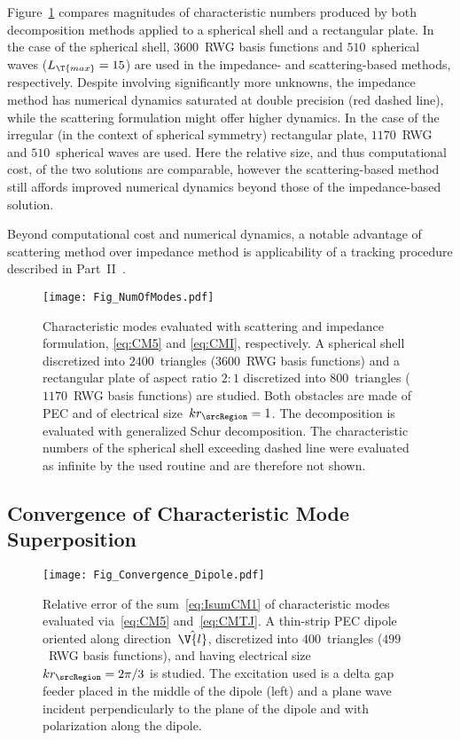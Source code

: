 \documentclass[journal]{IEEEtran}
\providecommand{\aCircum}{r_\srcRegion} %
\begin{document}
Figure~\ref{fig:dynamics} compares magnitudes of characteristic numbers produced by both decomposition methods applied to a spherical shell and a rectangular plate.  In the case of the spherical shell, $3600$~RWG basis functions and $510$~spherical waves ($L_\T{max} = 15$) are used in the impedance- and scattering-based methods, respectively. Despite involving significantly more unknowns, the impedance method has numerical dynamics saturated at double precision (red dashed line), while the scattering formulation might offer higher dynamics. In the case of the irregular (in the context of spherical symmetry) rectangular plate, $1170$~RWG and $510$~spherical waves are used. Here the relative size, and thus computational cost, of the two solutions are comparable, however the scattering-based method still affords improved numerical dynamics beyond those of the impedance-based solution.

Beyond computational cost and numerical dynamics, a notable advantage of scattering method over impedance method is applicability of a tracking procedure described in Part~II~\cite{Gustafsson+etal_CMT2_2021}.

\begin{figure}[]
    \centering
    \texttt{[image: Fig\_NumOfModes.pdf]}
    \caption{Characteristic modes evaluated with scattering and impedance formulation, \eqref{eq:CM5} and \eqref{eq:CMI}, respectively. A spherical shell discretized into $2400$~triangles ($3600$~RWG basis functions) and a rectangular plate of aspect ratio $2:1$ discretized into $800$~triangles ($1170$~RWG basis functions) are studied. Both obstacles are made of PEC and of electrical size~$k\aCircum = 1$. The decomposition is evaluated with generalized Schur decomposition. The characteristic numbers of the spherical shell exceeding dashed line were evaluated as infinite by the used routine and are therefore not shown.}
    \label{fig:dynamics}
\end{figure}

\subsection{Convergence of Characteristic Mode Superposition}
\label{sec:disc:conv}

\begin{figure}[]
    \centering
    \texttt{[image: Fig\_Convergence\_Dipole.pdf]}
    \caption{Relative error of the sum~\eqref{eq:IsumCM1} of characteristic modes evaluated via~\eqref{eq:CM5} and~\eqref{eq:CMTJ}. A thin-strip PEC dipole oriented along direction~$\hat{\V{l}}$, discretized into $400$~triangles ($499$~RWG basis functions), and having electrical size~$k\aCircum = 2\pi/3$ is studied. The excitation used is a delta gap feeder placed in the middle of the dipole (left) and a plane wave incident perpendicularly to the plane of the dipole and with polarization along the dipole.}
    \label{fig:convergence}
\end{figure}
\end{document}
